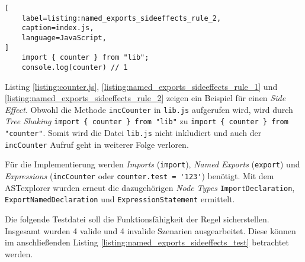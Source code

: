 \begin{lstlisting}[
    label=listing:named_exports_sideeffects_rule_2,
	caption=index.js,
	language=JavaScript,
]
	import { counter } from "lib";
	console.log(counter) // 1
\end{lstlisting}

Listing \ref{listing:counter.js}, \ref{listing:named_exports_sideeffects_rule_1} und \ref{listing:named_exports_sideeffects_rule_2} zeigen ein Beispiel für einen \textit{Side Effect}. Obwohl die Methode \lstinline{incCounter} in \lstinline{lib.js} aufgerufen wird, wird durch \textit{Tree Shaking} \lstinline|import { counter } from "lib"| zu \lstinline|import { counter } from "counter"|. Somit wird die Datei \lstinline{lib.js} nicht inkludiert und auch der \lstinline{incCounter} Aufruf geht in weiterer Folge verloren.

Für die Implementierung werden \textit{Imports} (\lstinline{import}), \textit{Named Exports} (\lstinline{export}) und \textit{Expressions} (\lstinline{incCounter} oder \lstinline{counter.test = '123'}) benötigt. Mit dem ASTexplorer wurden erneut die dazugehörigen \textit{Node Types} \lstinline{ImportDeclaration}, \lstinline{ExportNamedDeclaration} und \lstinline{ExpressionStatement} ermittelt.

Die folgende Testdatei soll die Funktionsfähigkeit der Regel sicherstellen. Insgesamt wurden 4 valide und 4 invalide Szenarien ausgearbeitet. Diese können im anschließenden Listing \ref{listing:named_exports_sideeffects_test} betrachtet werden.

